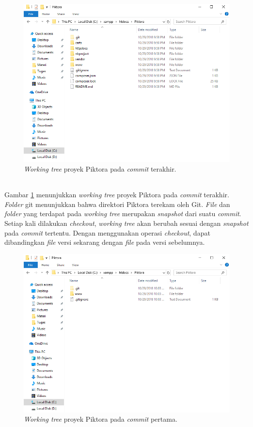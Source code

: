 \begin{figure}[H]
	\centering
		\includegraphics[scale=0.6]{Gambar/piktora_last_commit.png}
	\caption{\textit{Working tree} proyek Piktora pada \textit{commit} terakhir.}
	\label{fig:piktora_last_wt}
\end{figure}
\ \\
Gambar \ref{fig:piktora_last_wt} menunjukkan \textit{working tree} proyek Piktora pada \textit{commit} terakhir. \textit{Folder} git menunjukkan bahwa direktori Piktora terekam oleh Git. \textit{File} dan \textit{folder} yang terdapat pada \textit{working tree} merupakan \textit{snapshot} dari suatu \textit{commit}. Setiap kali dilakukan \textit{checkout}, \textit{working tree} akan berubah sesuai dengan \textit{snapshot} pada \textit{commit} tertentu. Dengan menggunakan operasi \textit{checkout}, dapat dibandingkan \textit{file} versi sekarang dengan \textit{file} pada versi sebelumnya.    
\begin{figure}[H]
	\centering
		\includegraphics[scale=0.6]{Gambar/piktora_first_commit.png}
	\caption{\textit{Working tree} proyek Piktora pada \textit{commit} pertama.}
	\label{fig:piktora_first_wt}
\end{figure}
